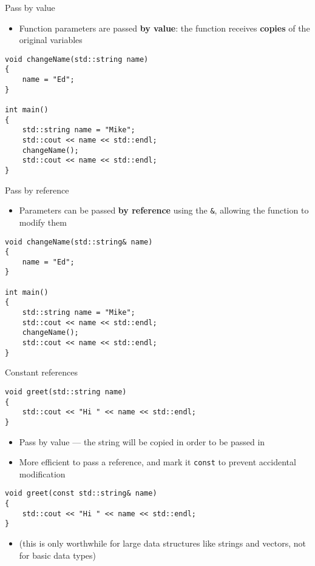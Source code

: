 \begin{frame}[fragile]{Pass by value}
    \begin{itemize}
        \item Function parameters are passed \textbf{by value}:
        the function receives \textbf{copies} of the original variables
    \end{itemize}
    \pause
    \begin{lstlisting}
void changeName(std::string name)
{
    name = "Ed";
}

int main()
{
    std::string name = "Mike";
    std::cout << name << std::endl;
    changeName();
    std::cout << name << std::endl;
}
    \end{lstlisting}
\end{frame}

\begin{frame}[fragile]{Pass by reference}
    \begin{itemize}
        \item Parameters can be passed \textbf{by reference} using the \lstinline{&}, allowing the function to modify them
    \end{itemize}
    \pause
    \begin{lstlisting}
void changeName(std::string& name)
{
    name = "Ed";
}

int main()
{
    std::string name = "Mike";
    std::cout << name << std::endl;
    changeName();
    std::cout << name << std::endl;
}
    \end{lstlisting}
\end{frame}

\begin{frame}[fragile]{Constant references}
    \begin{lstlisting}
void greet(std::string name)
{
    std::cout << "Hi " << name << std::endl;
}
    \end{lstlisting}
    \begin{itemize}
        \item Pass by value --- the string will be copied in order to be passed in
        \item More efficient to pass a reference, and mark it \lstinline{const} to prevent accidental modification
    \end{itemize}
    \begin{lstlisting}
void greet(const std::string& name)
{
    std::cout << "Hi " << name << std::endl;
}
    \end{lstlisting}
    \begin{itemize}
        \item (this is only worthwhile for large data structures like strings and vectors, not for basic data types)
    \end{itemize}
\end{frame}

